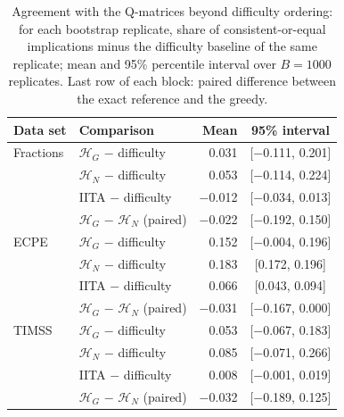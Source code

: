 \begin{table}[htbp]
	\centering
	\caption{Agreement with the Q-matrices beyond difficulty ordering: for each bootstrap replicate, share of consistent-or-equal implications minus the difficulty baseline of the same replicate; mean and 95\% percentile interval over $B=1000$ replicates. Last row of each block: paired difference between the exact reference and the greedy.}\label{tab:realgain}
	\small
	\setlength{\tabcolsep}{4pt}
	\begin{tabular}{llrc}\toprule
		Data set & Comparison & Mean & 95\% interval\\\midrule
		Fractions & $\mathcal H_G$ $-$ difficulty & 0.031 & [$-$0.111, 0.201]\\
		 & $\mathcal H_N$ $-$ difficulty & 0.053 & [$-$0.114, 0.224]\\
		 & IITA $-$ difficulty & $-$0.012 & [$-$0.034, 0.013]\\
		 & $\mathcal H_G$ $-$ $\mathcal H_N$ (paired) & $-$0.022 & [$-$0.192, 0.150]\\
		\midrule
		ECPE & $\mathcal H_G$ $-$ difficulty & 0.152 & [$-$0.004, 0.196]\\
		 & $\mathcal H_N$ $-$ difficulty & 0.183 & [0.172, 0.196]\\
		 & IITA $-$ difficulty & 0.066 & [0.043, 0.094]\\
		 & $\mathcal H_G$ $-$ $\mathcal H_N$ (paired) & $-$0.031 & [$-$0.167, 0.000]\\
		\midrule
		TIMSS & $\mathcal H_G$ $-$ difficulty & 0.053 & [$-$0.067, 0.183]\\
		 & $\mathcal H_N$ $-$ difficulty & 0.085 & [$-$0.071, 0.266]\\
		 & IITA $-$ difficulty & 0.008 & [$-$0.001, 0.019]\\
		 & $\mathcal H_G$ $-$ $\mathcal H_N$ (paired) & $-$0.032 & [$-$0.189, 0.125]\\
		\bottomrule
	\end{tabular}
\end{table}

